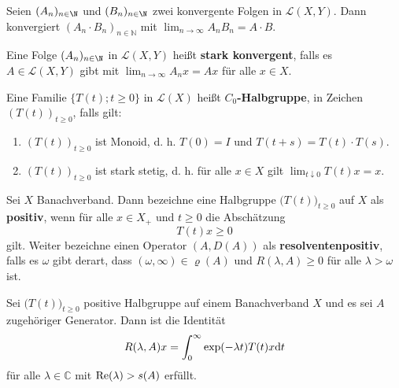 \begin{prop}
  Seien $(A_n)_{n\in \N}$ und $(B_n)_{n\in \N}$ zwei konvergente Folgen  in $\mathcal L(X,Y)$. Dann konvergiert $(A_n\cdot B_n)_{n\in\mathbb N}$ mit $\lim_{n\to\infty}A_n B_n = A\cdot B$.
\end{prop}

\begin{defi}
  Eine Folge $(A_n)_{n\in\N}$ in $\mathcal L(X,Y)$ heißt \textbf{stark konvergent}, falls es $A\in\mathcal L(X,Y)$ gibt mit $\lim_{n\to\infty} A_nx = Ax$ für alle $x\in X$.
\end{defi}



\begin{defi}
Eine Familie $\{T(t); t\geq0\}$ in $\mathcal L(X)$  heißt \textbf{$C_0$-Halbgruppe}, in Zeichen $(T(t))_{t\geq0}$, falls gilt:
\begin{enumerate}
\item $(T(t))_{t\geq0}$ ist Monoid, d. h. $T(0)=I$ und $T(t+s)=T(t)\cdot T(s)$.
\item $(T(t))_{t\geq0}$ ist stark stetig, d. h. für alle  $x\in X$ gilt $\lim_{t\downarrow 0}T(t)x=x$. 
\end{enumerate}
\end{defi}

\begin{defi}
Sei $X$ Banachverband. Dann bezeichne eine Halbgruppe $\big(T(t)\big)_{t\geq0}$ auf $X$ als \textbf{positiv}, wenn für alle $x\in X_+$ und $t\geq0$ die Abschätzung 
\begin{equation}\label{eq:}
T(t)x\geq0
\end{equation}
gilt. Weiter bezeichne einen Operator $(A,D(A))$ als \textbf{resolventenpositiv}, falls es $\omega$ gibt derart, dass $(\omega, \infty)\in\varrho(A)$ und $R(\lambda, A)\geq0$ für alle $\lambda >\omega$ ist.
\end{defi}

\begin{prop}\cite{banasiak_arlotti_2006}\label{Integraldarstellung der Resolvente}
Sei $\big(T(t)\big)_{t\geq0}$ positive Halbgruppe auf einem Banachverband $X$ und es sei $A$ zugehöriger Generator. Dann ist die Identität
\begin{equation}\label{eq:}
R(\lambda, A)x=\int_0^\infty \exp(-\lambda t)T(t)x\textnormal dt
\end{equation}
für alle $\lambda\in \mathbb C$ mit $\textnormal{Re}(\lambda)> s(A)$ erfüllt.
\end{prop}

